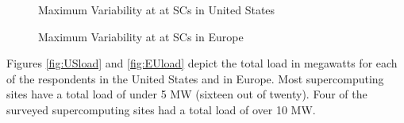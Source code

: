 \begin{figure}[ht!]
\begin{center}
\caption{Maximum Variability at at SCs in United States}
\label{fig:USvar}
\vspace{0.9cm}
\caption{Maximum Variability at at SCs in Europe}
\label{fig:EUvar}
\end{center}
\end{figure}

Figures \ref{fig:USload} and \ref{fig:EUload} depict the total load in megawatts for each of the respondents in the United States and in Europe. Most supercomputing sites have a total load of under 5 MW (sixteen out of twenty). Four of the surveyed supercomputing sites had a total load of over 10 MW. \\

